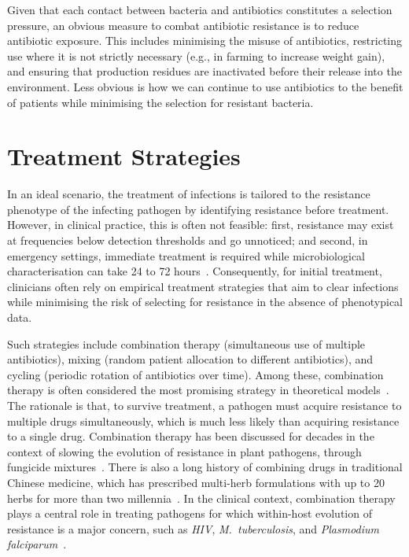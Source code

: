 \documentclass[../main.tex]{subfiles}
\begin{document}
Given that each contact between bacteria and antibiotics constitutes a selection pressure, an obvious measure to combat antibiotic resistance is to reduce antibiotic exposure.
This includes minimising the misuse of antibiotics, restricting use where it is not strictly necessary (e.g., in farming to increase weight gain), and ensuring that production residues are inactivated before their release into the environment.
Less obvious is how we can continue to use antibiotics to the benefit of patients while minimising the selection for resistant bacteria.

\section{Treatment Strategies}
In an ideal scenario, the treatment of infections is tailored to the resistance phenotype of the infecting pathogen by identifying resistance before treatment.
However, in clinical practice, this is often not feasible: first, resistance may exist at frequencies below detection thresholds and go unnoticed; and second, in emergency settings, immediate treatment is required while microbiological characterisation can take 24 to 72 hours~\cite{Leekha2011}.
Consequently, for initial treatment,  clinicians often rely on empirical treatment strategies  that aim to clear infections while minimising the risk of selecting for resistance in the absence of phenotypical data.

Such strategies include combination therapy (simultaneous use of multiple antibiotics), mixing (random patient allocation to different antibiotics), and cycling (periodic rotation of antibiotics over time).
Among these, combination therapy is often considered the most promising strategy in theoretical models~\cite{Bonhoeffer1997, Tepekule2017, Uecker2021}.
The rationale is that, to survive treatment, a pathogen must acquire resistance to multiple drugs simultaneously, which is much less likely than acquiring resistance to a single drug.
Combination therapy has been discussed for decades in the context of slowing the evolution of resistance in plant pathogens, through fungicide mixtures~\cite{Kable1980, Delp1980, Skylakakis1981}.
There is also a long history of combining drugs in traditional Chinese medicine, which has prescribed multi-herb formulations with up to 20 herbs for more than two millennia~\cite{Yuan2000}.
In the clinical context, combination therapy plays a central role in treating pathogens for which within-host evolution of resistance is a major concern, such as \textit{HIV}, \textit{M.~tuberculosis}, and \textit{Plasmodium falciparum}~\cite{Goldberg2012}.
\end{document}
